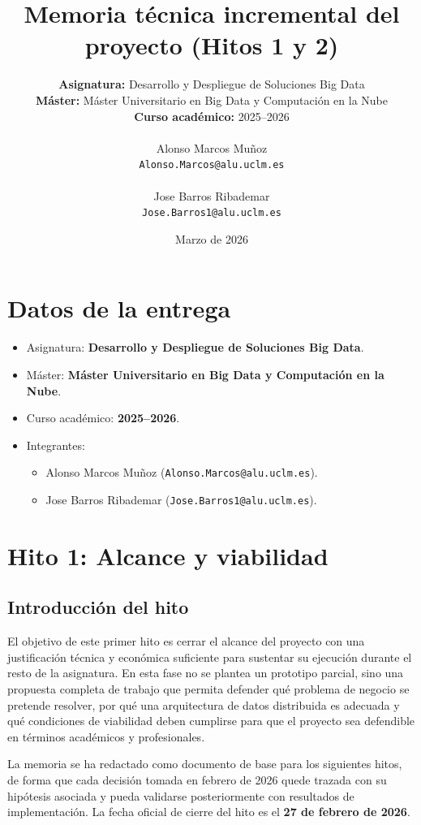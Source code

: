 \documentclass[12pt,a4paper]{article}
\title{\textbf{Memoria técnica incremental del proyecto (Hitos 1 y 2)}}
\author{
\textbf{Asignatura:} Desarrollo y Despliegue de Soluciones Big Data \\
\textbf{Máster:} Máster Universitario en Big Data y Computación en la Nube \\
\textbf{Curso académico:} 2025--2026 \\
\\
Alonso Marcos Muñoz \\
\texttt{Alonso.Marcos@alu.uclm.es} \\
\\
Jose Barros Ribademar \\
\texttt{Jose.Barros1@alu.uclm.es}
}
\date{Marzo de 2026}
\begin{document}
\maketitle
\tableofcontents
\newpage

\section*{Datos de la entrega}

\begin{itemize}
    \item Asignatura: \textbf{Desarrollo y Despliegue de Soluciones Big Data}.
    \item Máster: \textbf{Máster Universitario en Big Data y Computación en la Nube}.
    \item Curso académico: \textbf{2025--2026}.
    \item Integrantes:
    \begin{itemize}
        \item Alonso Marcos Muñoz (\texttt{Alonso.Marcos@alu.uclm.es}).
        \item Jose Barros Ribademar (\texttt{Jose.Barros1@alu.uclm.es}).
    \end{itemize}
\end{itemize}

\section{Hito 1: Alcance y viabilidad}

\subsection{Introducción del hito}

El objetivo de este primer hito es cerrar el alcance del proyecto con una justificación técnica y económica suficiente para sustentar su ejecución durante el resto de la asignatura. En esta fase no se plantea un prototipo parcial, sino una propuesta completa de trabajo que permita defender qué problema de negocio se pretende resolver, por qué una arquitectura de datos distribuida es adecuada y qué condiciones de viabilidad deben cumplirse para que el proyecto sea defendible en términos académicos y profesionales.

La memoria se ha redactado como documento de base para los siguientes hitos, de forma que cada decisión tomada en febrero de 2026 quede trazada con su hipótesis asociada y pueda validarse posteriormente con resultados de implementación. La fecha oficial de cierre del hito es el \textbf{27 de febrero de 2026}.
\end{document}
